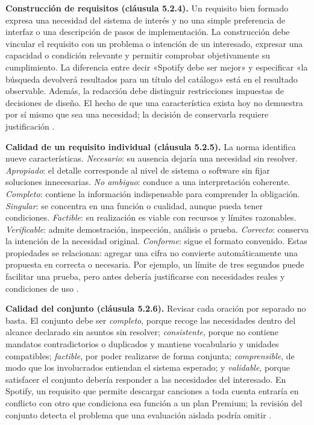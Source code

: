 \textbf{Construcción de requisitos (cláusula 5.2.4).} Un requisito bien formado expresa una necesidad del sistema de interés y no una simple preferencia de interfaz o una descripción de pasos de implementación. La construcción debe vincular el requisito con un problema o intención de un interesado, expresar una capacidad o condición relevante y permitir comprobar objetivamente su cumplimiento. La diferencia entre decir «Spotify debe ser mejor» y especificar «la búsqueda devolverá resultados para un título del catálogo» está en el resultado observable. Además, la redacción debe distinguir restricciones impuestas de decisiones de diseño. El hecho de que una característica exista hoy no demuestra por sí mismo que sea una necesidad; la decisión de conservarla requiere justificación \cite{iso29148,pohl2025}.

\textbf{Calidad de un requisito individual (cláusula 5.2.5).} La norma identifica nueve características. \emph{Necesario}: su ausencia dejaría una necesidad sin resolver. \emph{Apropiado}: el detalle corresponde al nivel de sistema o software sin fijar soluciones innecesarias. \emph{No ambiguo}: conduce a una interpretación coherente. \emph{Completo}: contiene la información indispensable para comprender la obligación. \emph{Singular}: se concentra en una función o cualidad, aunque pueda tener condiciones. \emph{Factible}: su realización es viable con recursos y límites razonables. \emph{Verificable}: admite demostración, inspección, análisis o prueba. \emph{Correcto}: conserva la intención de la necesidad original. \emph{Conforme}: sigue el formato convenido. Estas propiedades se relacionan: agregar una cifra no convierte automáticamente una propuesta en correcta o necesaria. Por ejemplo, un límite de tres segundos puede facilitar una prueba, pero antes debería justificarse con necesidades reales y condiciones de uso \cite{iso29148}.

\textbf{Calidad del conjunto (cláusula 5.2.6).} Revisar cada oración por separado no basta. El conjunto debe ser \emph{completo}, porque recoge las necesidades dentro del alcance declarado sin asuntos sin resolver; \emph{consistente}, porque no contiene mandatos contradictorios o duplicados y mantiene vocabulario y unidades compatibles; \emph{factible}, por poder realizarse de forma conjunta; \emph{comprensible}, de modo que los involucrados entiendan el sistema esperado; y \emph{validable}, porque satisfacer el conjunto debería responder a las necesidades del interesado. En Spotify, un requisito que permite descargar canciones a toda cuenta entraría en conflicto con otro que condiciona esa función a un plan Premium; la revisión del conjunto detecta el problema que una evaluación aislada podría omitir \cite{iso29148}.

